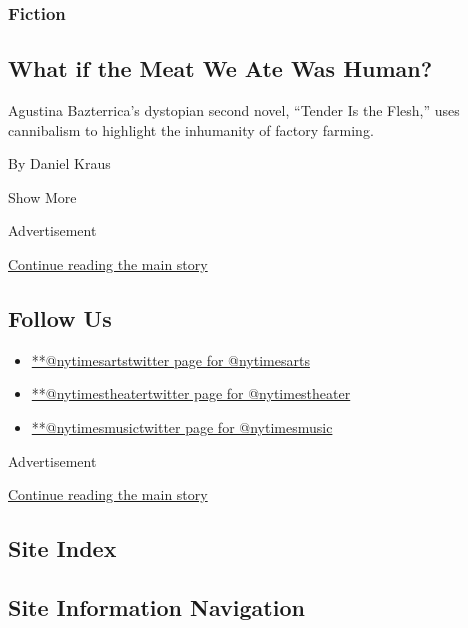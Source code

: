\begin{enumerate}
  \hypertarget{fiction}{%
  \subsubsection{Fiction}\label{fiction}}

  \hypertarget{what-if-the-meat-we-ate-was-human}{%
  \subsection{What if the Meat We Ate Was
  Human?}\label{what-if-the-meat-we-ate-was-human}}

  Agustina Bazterrica's dystopian second novel, ``Tender Is the Flesh,''
  uses cannibalism to highlight the inhumanity of factory farming.

  By Daniel Kraus
\end{enumerate}

Show More

Advertisement

\protect\hyperlink{after-mid2}{Continue reading the main story}

\hypertarget{follow-us}{%
\subsection{Follow Us}\label{follow-us}}

\begin{itemize}
\tightlist
\item
  \href{https://twitter.com/nytimesarts}{**@nytimesartstwitter page for
  @nytimesarts}
\item
  \href{https://twitter.com/nytimestheater}{**@nytimestheatertwitter
  page for @nytimestheater}
\item
  \href{https://twitter.com/nytimesmusic}{**@nytimesmusictwitter page
  for @nytimesmusic}
\end{itemize}

Advertisement

\protect\hyperlink{after-mktg}{Continue reading the main story}

\hypertarget{site-index}{%
\subsection{Site Index}\label{site-index}}

\hypertarget{site-information-navigation}{%
\subsection{Site Information
Navigation}\label{site-information-navigation}}

